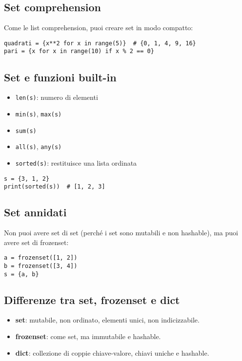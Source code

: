 \documentclass[a4paper,12pt]{article}
\begin{document}
\subsection*{Set comprehension}
Come le list comprehension, puoi creare set in modo compatto:
\begin{lstlisting}
quadrati = {x**2 for x in range(5)}  # {0, 1, 4, 9, 16}
pari = {x for x in range(10) if x % 2 == 0}
\end{lstlisting}

\subsection*{Set e funzioni built-in}
\begin{itemize}
    \item \texttt{len(s)}: numero di elementi
    \item \texttt{min(s)}, \texttt{max(s)}
    \item \texttt{sum(s)}
    \item \texttt{all(s)}, \texttt{any(s)}
    \item \texttt{sorted(s)}: restituisce una lista ordinata
\end{itemize}
\begin{lstlisting}
s = {3, 1, 2}
print(sorted(s))  # [1, 2, 3]
\end{lstlisting}

\subsection*{Set annidati}
Non puoi avere set di set (perché i set sono mutabili e non hashable), ma puoi avere set di frozenset:
\begin{lstlisting}
a = frozenset([1, 2])
b = frozenset([3, 4])
s = {a, b}
\end{lstlisting}

\subsection*{Differenze tra set, frozenset e dict}
\begin{itemize}
    \item \textbf{set}: mutabile, non ordinato, elementi unici, non indicizzabile.
    \item \textbf{frozenset}: come set, ma immutabile e hashable.
    \item \textbf{dict}: collezione di coppie chiave-valore, chiavi uniche e hashable.
\end{itemize}
\end{document}
